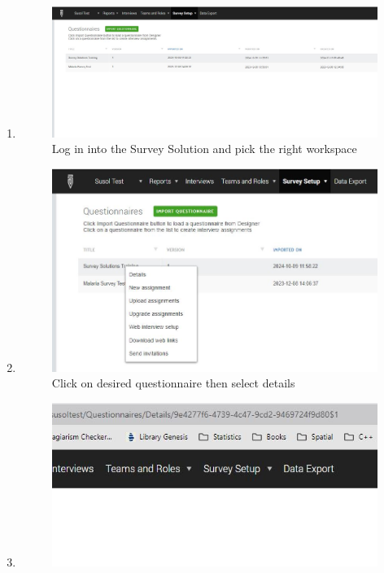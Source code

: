 \documentclass[
  letterpaper,
  DIV=11,
  numbers=noendperiod]{scrreprt}
\begin{document}
\begin{enumerate}
\def\labelenumi{\arabic{enumi}.}
\item
  \begin{figure}[H]

  {\centering \includegraphics{images/login_susol.JPG}

  }

  \caption{Log in into the Survey Solution and pick the right workspace}

  \end{figure}%
\item
  \begin{figure}[H]

  {\centering \includegraphics{images/click_quiz_details.JPG}

  }

  \caption{Click on desired questionnaire then select details}

  \end{figure}%
\item
  \begin{figure}[H]

  {\centering \includegraphics{images/quizid.JPG}

}
\end{figure}
\end{enumerate}
\end{document}

